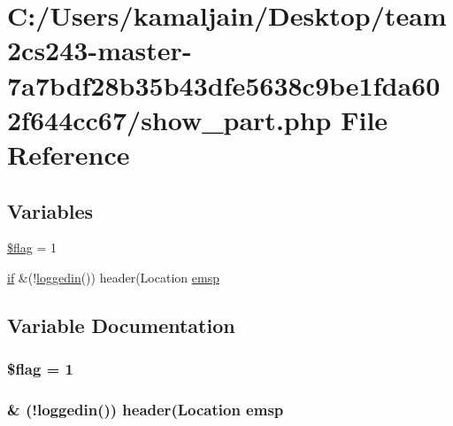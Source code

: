 \hypertarget{show__part_8php}{}\section{C\+:/\+Users/kamaljain/\+Desktop/team2cs243-\/master-\/7a7bdf28b35b43dfe5638c9be1fda602f644cc67/show\+\_\+part.php File Reference}
\label{show__part_8php}
\subsection*{Variables}
\begin{DoxyCompactItemize}
\item 
\hyperlink{show__part_8php_acf5d6dd3ee125abb9a2523b30bc47d02}{\$flag} = 1
\item 
\hyperlink{login_8php_a6cf3ef86567b2d2e235730bbe61cb311}{if} \&(!\hyperlink{core_8php_aab6c166eb2634a4ddbacc2f19417fe5c}{loggedin}()) header(\textquotesingle{}Location \hyperlink{show__part_8php_afa30d5bb1e7774ef5f682c4949a11548}{emsp}
\end{DoxyCompactItemize}


\subsection{Variable Documentation}
\subsubsection[{\texorpdfstring{\$flag}{$flag}}]{\setlength{\rightskip}{0pt plus 5cm}\$flag = 1}\hypertarget{show__part_8php_acf5d6dd3ee125abb9a2523b30bc47d02}{}\label{show__part_8php_acf5d6dd3ee125abb9a2523b30bc47d02}
\subsubsection[{\texorpdfstring{emsp}{emsp}}]{\& (!{\bf loggedin}()) header(\textquotesingle{}Location emsp}\hypertarget{show__part_8php_afa30d5bb1e7774ef5f682c4949a11548}{}\label{show__part_8php_afa30d5bb1e7774ef5f682c4949a11548}
